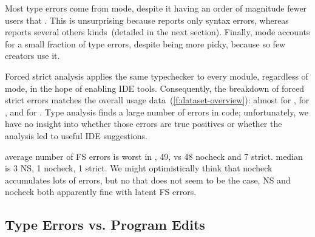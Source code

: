 \documentclass[english,submission,cleveref]{programming}
\begin{document}
Most type errors come from \mnonstrict{} mode, despite it having an order
of magnitude fewer users that \mnocheck{}.
This is unsurprising because \mnocheck{} reports only syntax errors,
whereas \mnonstrict{} reports several others kinds~(detailed in the next section).
Finally, \mstrict{} mode accounts for a small fraction of type errors, despite
being more picky, because so few creators use it.

Forced strict analysis applies the same typechecker to every module, regardless
of mode, in the hope of enabling IDE tools.
Consequently, the breakdown of forced strict errors matches the overall usage
data~(\cref{f:dataset-overview}): almost  for \mnocheck{},
 for \mnonstrict{}, and  for \mstrict{}.
Type analysis finds a large number of errors in \mnocheck{} code;
unfortunately, we have no insight into whether those errors are true
positives or whether the analysis led to useful IDE suggestions.

\FILL{} average number of FS errors is
worst in \mnonstrict{}, 49, vs 48 nocheck and 7 strict.
median is 3 NS, 1 nocheck, 1 strict.
We might optimistically think that nocheck accumulates
lots of errors, but no that does not seem to be the case,
NS and nocheck both apparently fine with latent FS errors.


\subsection{Type Errors vs. Program Edits}
\label{s:type-error-survival}
\end{document}
